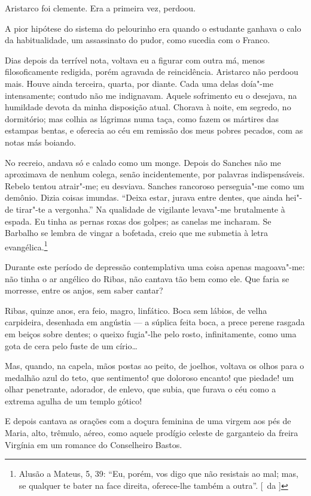 Aristarco foi clemente. Era a primeira vez, perdoou. 

A pior hipótese do sistema do pelourinho era quando o
estudante ganhava o calo da habitualidade, um assassinato do pudor,
como sucedia com o Franco. 

Dias depois da terrível nota, voltava eu a
figurar com outra má, menos filosoficamente redigida, porém agravada de reincidência. 
Aristarco não perdoou mais. Houve ainda
terceira, quarta, por diante. Cada uma delas doía"-me intensamente;
contudo não me indignavam. Aquele sofrimento eu o desejava, na
humildade devota da minha disposição atual. Chorava à noite, em
segredo, no dormitório; mas colhia as lágrimas numa taça, como fazem os
mártires das estampas bentas, e oferecia ao céu em remissão dos meus
pobres pecados, com as notas más boiando. 

No recreio, andava só e
calado como um monge. Depois do Sanches não me aproximava de nenhum
colega, senão incidentemente, por palavras indispensáveis. Rebelo
tentou atrair"-me; eu desviava. Sanches rancoroso perseguia"-me como
um demônio. Dizia coisas imundas. ``Deixa estar, jurava entre dentes,
que ainda hei"-de tirar"-te a vergonha.'' Na qualidade de vigilante
levava"-me brutalmente à espada. Eu tinha as pernas roxas dos golpes;
as canelas me incharam. Se Barbalho se lembra de vingar a bofetada,
creio que me submetia à letra evangélica.\footnote{ Alusão a Mateus, 5, 39: 
``Eu, porém, vos digo que não resistais ao mal; mas, se qualquer te bater 
na face direita, oferece-lhe também a outra''. [~da ]} 

Durante este período de
depressão contemplativa uma coisa apenas magoava"-me: não tinha o ar
angélico do Ribas, não cantava tão bem como ele. Que faria se morresse,
entre os anjos, sem saber cantar? 

Ribas, quinze anos, era feio, magro,
linfático. Boca sem lábios, de velha carpideira, desenhada em angústia
 --- a súplica feita boca, a prece perene rasgada em beiços sobre
dentes; o queixo fugia"-lhe pelo rosto, infinitamente, como uma gota
de cera pelo fuste de um círio\ldots{} 

Mas, quando, na capela, mãos postas
ao peito, de joelhos, voltava os olhos para o medalhão azul do teto,
que sentimento! que doloroso encanto! que piedade! um olhar penetrante,
adorador, de enlevo, que subia, que furava o céu como a extrema agulha
de um templo gótico! 

E depois cantava as orações com a doçura feminina
de uma virgem aos pés de Maria, alto, trêmulo, aéreo, como aquele
prodígio celeste de garganteio da freira Virgínia em um romance do
Conselheiro Bastos. 

